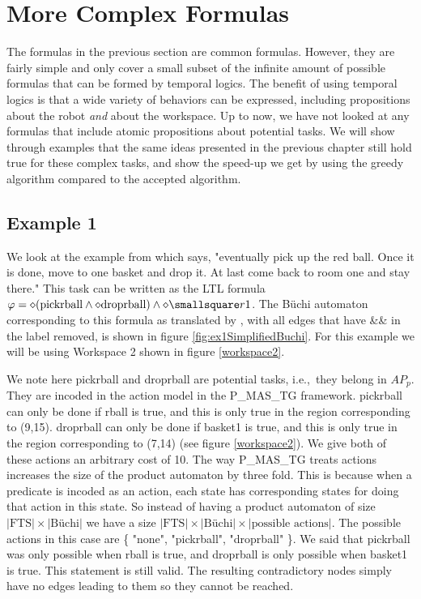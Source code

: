 \chapter{More Complex Formulas}
The formulas in the previous section are common formulas. However, they are fairly simple and only cover a small subset of the infinite amount of possible formulas that can be formed by temporal logics. The benefit of using temporal logics is that a wide variety of behaviors can be expressed, including propositions about the robot \textit{and} about the workspace. Up to now, we have not looked at any formulas that include atomic propositions about potential tasks. We will show through examples that the same ideas presented in the previous chapter still hold true for these complex tasks, and show the speed-up we get by using the greedy algorithm compared to the accepted algorithm. 

\section{Example 1}
We look at the example from \cite{guo15} which says, "eventually pick up the red ball. Once it is done, move to one basket and drop it. At last come back to room one and stay there." This task can be written as the LTL formula $\varphi = \diamond (\text{pickrball} \wedge \diamond \text{droprball}) \wedge \diamond \smallsquare r1$. The B\"uchi automaton corresponding to this formula as translated by \cite{ltlbuchiwebsite}, with all edges that have \&\& in the label removed, is shown in figure \ref{fig:ex1SimplifiedBuchi}. For this example we will be using Workspace 2 shown in figure \ref{workspace2}.

We note here pickrball and droprball are potential tasks, i.e.,\ they belong in $AP_p$. They are incoded in the action model in the P\_MAS\_TG framework. pickrball can only be done if rball is true, and this is only true in the region corresponding to (9,15).  droprball can only be done if basket1 is true, and this is only true in the region corresponding to (7,14) (see figure \ref{workspace2}). We give both of these actions an arbitrary cost of 10. The way P\_MAS\_TG treats actions increases the size of the product automaton by three fold. This is because when a predicate is incoded as an action, each state has corresponding states for doing that action in this state. So instead of having a product automaton of size $|\text{FTS}| \times |\text{B\"uchi}| $ we have a size $|\text{FTS}| \times |\text{B\"uchi}| \times |\text{possible actions}|$. The possible actions in this case are \{ "none", "pickrball", "droprball" \}. We said that pickrball was only possible when rball is true, and droprball is only possible when basket1 is true. This statement is still valid. The resulting contradictory nodes simply have no edges leading to them so they cannot be reached. 


